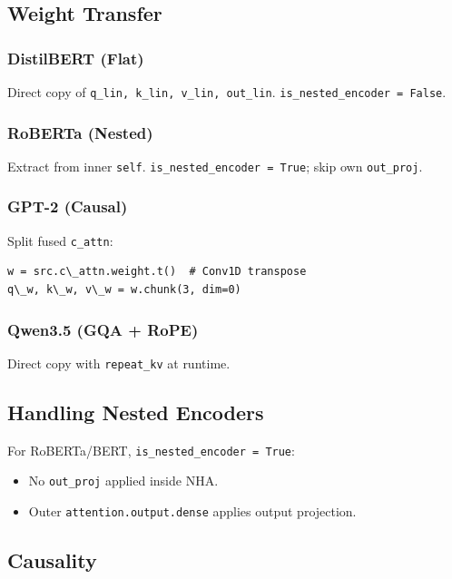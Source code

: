 \subsection{Weight Transfer}

\subsubsection{DistilBERT (Flat)}

Direct copy of \texttt{q\_lin, k\_lin, v\_lin, out\_lin}. \texttt{is\_nested\_encoder = False}.

\subsubsection{RoBERTa (Nested)}

Extract from inner \texttt{self}. \texttt{is\_nested\_encoder = True}; skip own \texttt{out\_proj}.

\subsubsection{GPT-2 (Causal)}

Split fused \texttt{c\_attn}:

\begin{lstlisting}
w = src.c\_attn.weight.t()  # Conv1D transpose
q\_w, k\_w, v\_w = w.chunk(3, dim=0)
\end{lstlisting}

\subsubsection{Qwen3.5 (GQA + RoPE)}

Direct copy with \texttt{repeat\_kv} at runtime.

\subsection{Handling Nested Encoders}

For RoBERTa/BERT, \texttt{is\_nested\_encoder = True}:
\begin{itemize}
\item No \texttt{out\_proj} applied inside NHA.
\item Outer \texttt{attention.output.dense} applies output projection.

\end{itemize}
\subsection{Causality}

